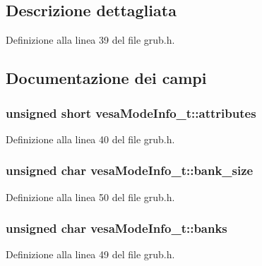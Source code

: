 \subsection{Descrizione dettagliata}


Definizione alla linea 39 del file grub.\+h.



\subsection{Documentazione dei campi}
\hypertarget{structvesaModeInfo__t_a339145bcfb50fc81609813734415d4db}{
\subsubsection[{attributes}]{\setlength{\rightskip}{0pt plus 5cm}unsigned short vesa\+Mode\+Info\+\_\+t\+::attributes}}\label{structvesaModeInfo__t_a339145bcfb50fc81609813734415d4db}


Definizione alla linea 40 del file grub.\+h.

\hypertarget{structvesaModeInfo__t_a6f7476f0df157c2fc8969131512a9bc1}{
\subsubsection[{bank\+\_\+size}]{\setlength{\rightskip}{0pt plus 5cm}unsigned char vesa\+Mode\+Info\+\_\+t\+::bank\+\_\+size}}\label{structvesaModeInfo__t_a6f7476f0df157c2fc8969131512a9bc1}


Definizione alla linea 50 del file grub.\+h.

\hypertarget{structvesaModeInfo__t_a543f6b11b8caed004dc0f4dd8fed13c8}{
\subsubsection[{banks}]{\setlength{\rightskip}{0pt plus 5cm}unsigned char vesa\+Mode\+Info\+\_\+t\+::banks}}\label{structvesaModeInfo__t_a543f6b11b8caed004dc0f4dd8fed13c8}


Definizione alla linea 49 del file grub.\+h.

